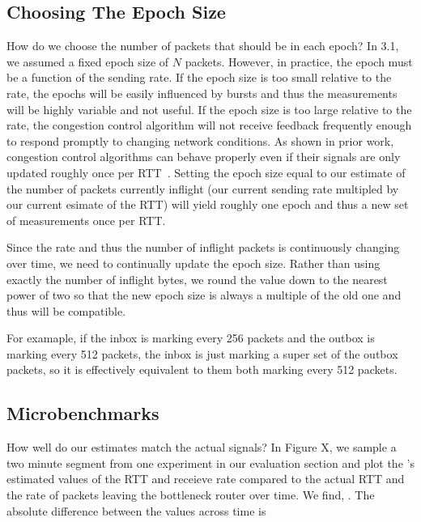 \subsection{Choosing The Epoch Size}
\label{s:measure:epoch}
How do we choose the number of packets that should be in each epoch?
In 3.1, we assumed a fixed epoch size of $N$ packets.
However, in practice, the epoch must be a function of the sending rate.
If the epoch size is too small relative to the rate,
the epochs will be easily influenced by bursts and thus the measurements will be highly variable
and not useful.
If the epoch size is too large relative to the rate, the congestion control algorithm will not
receive feedback frequently enough to respond promptly to changing network conditions. 
As shown in prior work, congestion control algorithms can behave properly even if their
signals are only updated roughly once per RTT~\cite{ccp-hotnets}.
Setting the epoch size equal to our estimate of the number of packets currently inflight 
(our current sending rate multipled by our current esimate of the RTT) will yield roughly
one epoch and thus a new set of measurements once per RTT.

Since the rate and thus the number of inflight packets is continuously changing over time,
we need to continually update the epoch size. Rather than using exactly the number of inflight
bytes, we round the value down to the nearest power of two so that the new epoch size is
always a multiple of the old one and thus will be compatible. 

For examaple, 
if the inbox is marking every 256 packets
and the outbox is marking every 512 packets, 
the inbox is just marking a super set of the outbox packets, 
so it is effectively equivalent to them both marking every 512 packets.
    
\subsection{Microbenchmarks}
\label{s:measure:microbench}

    How well do our estimates match the actual signals? In Figure X, we sample a two minute segment from 
    one experiment in our evaluation section and plot the \inbox's estimated values 
    of the RTT and receieve rate compared to the actual RTT and the rate of packets leaving 
    the bottleneck router over time. We find, . The absolute difference between the values
    across time is 

